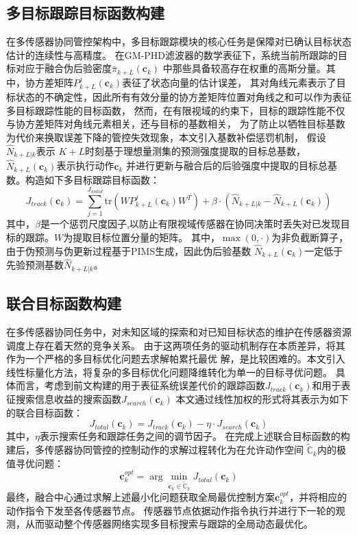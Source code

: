 \subsection{多目标跟踪目标函数构建}
在多传感器协同管控架构中，多目标跟踪模块的核心任务是保障对已确认目标状态估计的连续性与高精度。
在GM-PHD滤波器的数学表征下，系统当前所跟踪的目标对应于融合伪后验密度$\bar{\pi}_{k+L}(\mathbf{c}_k)$
中那些具备较高存在权重的高斯分量。其中，协方差矩阵$P_{k+L}^j(\mathbf{c}_k)$表征了状态向量的估计误差，
其对角线元素表示了目标状态的不确定性，因此所有有效分量的协方差矩阵位置对角线之和可以作为表征多目标跟踪性能的目标函数，
然而，在有限视域的约束下，目标的跟踪性能不仅与协方差矩阵对角线元素相关，还与目标的基数相关，
为了防止以牺牲目标基数为代价来换取误差下降的管控失效现象，本文引入基数补偿惩罚机制，
假设$\hat{N}_{k+L|k}$表示
$K+L$时刻基于理想量测集的预测强度提取的目标总基数，$\hat{N}_{k+L}(\mathbf{c}_k)$表示执行动作$\mathbf{c}_k$
并进行更新与融合后的后验强度中提取的目标总基数。构造如下多目标跟踪目标函数：
\begin{equation}
J_{track}(\mathbf{c}_k)=\sum_{j=1}^{J_{walid}}\mathrm{tr}\left(WP_{k+L}^j(\mathbf{c}_k)W^T\right)+\beta\cdot\left(\hat{N}_{k+L|k}-\hat{N}_{k+L}(\mathbf{c}_k)\right)
\end{equation}
其中，$\beta$是一个惩罚尺度因子,以防止有限视域传感器在协同决策时丢失对已发现目标的跟踪。$W$为提取目标位置分量的矩阵。
其中，$\max(0, \cdot)$为非负截断算子，由于伪预测与伪更新过程基于PIMS生成，因此伪后验基数
$\hat{N}_{k+L}(\mathbf{c}_k)$一定低于先验预测基数$\hat{N}_{k+L|k}$。

\subsection{联合目标函数构建}
在多传感器协同任务中，对未知区域的探索和对已知目标状态的维护在传感器资源调度上存在着天然的竞争关系。
由于这两项任务的驱动机制存在本质差异，将其作为一个严格的多目标优化问题去求解帕累托最优
解，是比较困难的。本文引入线性标量化方法，将复杂的多目标优化问题降维转化为单一的目标寻优问题。
具体而言，考虑到前文构建的用于表征系统误差代价的跟踪函数$J_{track}(\mathbf{c}_k)$和用于表征搜索信息收益的搜索函数$J_{search}(\mathbf{c}_k)$ 
本文通过线性加权的形式将其表示为如下的联合目标函数：
\begin{equation}
J_{total}(\mathbf{c}_k)=J_{track}(\mathbf{c}_k)-\eta\cdot J_{search}(\mathbf{c}_k)
\end{equation}
其中，$\eta$表示搜索任务和跟踪任务之间的调节因子。
在完成上述联合目标函数的构建后，多传感器协同管控的控制动作的求解过程转化为在允许动作空间
$\tilde{\mathbb{C}}_k$内的极值寻优问题：
\begin{equation}
\mathbf{c}_k^{opt}=\arg\min_{\mathbf{c}_k\in\tilde{\mathbb{C}}_k}J_{total}(\mathbf{c}_k)
\end{equation}
最终，融合中心通过求解上述最小化问题获取全局最优控制方案$\mathbf{c}_k^{opt}$，并将相应的动作指令下发至各传感器节点。
传感器节点依据动作指令执行并进行下一轮的观测，从而驱动整个传感器网络实现多目标搜索与跟踪的全局动态最优化。